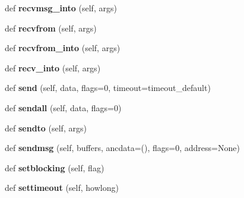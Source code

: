 \begin{DoxyCompactItemize}
\item 
\mbox{\label{classgevent_1_1__socket3_1_1socket_a2c7abda41571db54e7989488e81d7352}} 
def {\bfseries recvmsg\+\_\+into} (self, args)
\item 
\mbox{\label{classgevent_1_1__socket3_1_1socket_ae786748280ddc7ec73898e0b31ed475b}} 
def {\bfseries recvfrom} (self, args)
\item 
\mbox{\label{classgevent_1_1__socket3_1_1socket_af2351950664bb5b7b9365423864a2908}} 
def {\bfseries recvfrom\+\_\+into} (self, args)
\item 
\mbox{\label{classgevent_1_1__socket3_1_1socket_af61c800be614bb3d031b15af1f04ef9e}} 
def {\bfseries recv\+\_\+into} (self, args)
\item 
\mbox{\label{classgevent_1_1__socket3_1_1socket_a017d75a84cf49580ce6824599d484866}} 
def {\bfseries send} (self, data, flags=0, timeout=timeout\+\_\+default)
\item 
\mbox{\label{classgevent_1_1__socket3_1_1socket_a25dd556e64da603071201cdb2c743c84}} 
def {\bfseries sendall} (self, data, flags=0)
\item 
\mbox{\label{classgevent_1_1__socket3_1_1socket_a2b64ae43c282bbb1077adcb6cce12b0e}} 
def {\bfseries sendto} (self, args)
\item 
\mbox{\label{classgevent_1_1__socket3_1_1socket_ae9c2724ab4e88bc30a60c7c305a29996}} 
def {\bfseries sendmsg} (self, buffers, ancdata=(), flags=0, address=None)
\item 
\mbox{\label{classgevent_1_1__socket3_1_1socket_aceecb6dfd2151a1c3af39190ee49d491}} 
def {\bfseries setblocking} (self, flag)
\item 
\mbox{\label{classgevent_1_1__socket3_1_1socket_a720502f1888078fbadc6d9a73c168508}} 
def {\bfseries settimeout} (self, howlong)

\end{DoxyCompactItemize}
